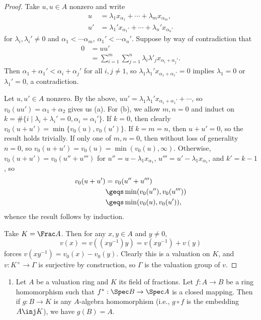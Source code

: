 \documentclass[12pt]{amsart}
\begin{document}
\begin{proof}
  Take $u,u\in A$ nonzero and write
  \begin{align*}
    u &=\lambda_1x_{\alpha_1}+\cdots +\lambda_mx_{\alpha_m}, \\
    u'&=\lambda_1'x_{\alpha_1'}+\cdots +\lambda_n'x_{\alpha_n'}
  \end{align*}
  for $\lambda_i,\lambda_i'\neq 0$ and $\alpha_1<\cdots \alpha_m$, $\alpha_1'<\cdots \alpha_n'$.
  Suppose by way of contradiction that
  \begin{align*}
    0&= uu' \\
     &= \sum_{i=1}^m\sum_{j=1}^n \lambda_i\lambda'_j x_{\alpha_i+\alpha_j'}.
  \end{align*}
  Then $\alpha_1+\alpha_1'<\alpha_i+\alpha_j'$ for all $i,j\neq 1$, so $\lambda_1\lambda_1'x_{\alpha_1+\alpha_1'}=0$ implies $\lambda_1=0$ or $\lambda_1'=0$, a contradiction.

  Let $u,u'\in A$ nonzero. 
  By the above, $uu'=\lambda_1\lambda_1'x_{\alpha_1+\alpha_1'}+\cdots$, so $v_0(uu')=\alpha_1+\alpha_2$ gives us (a).
  For (b), we allow $m,n=0$ and induct on $k=\#\{i\mid \lambda_i+\lambda_i'=0, \alpha_i=\alpha_i'\}$.
  If $k=0$, then clearly $v_0(u+u')=\min\{v_0(u),v_0(u')\}$.
  If $k=m=n$, then $u+u'=0$, so the result holds trivially.
  If only one of $m,n=0$, then without loss of generality $n=0$, so $v_0(u+u')=v_0(u)=\min(v_0(u),\infty)$.
  Otherwise, $v_0(u+u')=v_0(u''+u''')$ for $u''=u-\lambda_1x_{\alpha_1}$, $u'''=u'-\lambda_1x_{\alpha_1}$, and $k'=k-1$, so
  \begin{align*}
    v_0(u+u') &= v_0(u''+u''') \\
            &\geqs \min(v_0(u''),v_0(u''')) \\
            &\geqs \min(v_0(u),v_0(u')),
  \end{align*}
  whence the result follows by induction.

  Take $K=\Frac A$.
  Then for any $x,y\in A$ and $y\neq 0$, 
  \[
    v(x) = v((xy^{-1})y)= v(xy^{-1})+v(y)
  \]
  forces $v(xy^{-1})=v_0(x)-v_0(y)$.
  Clearly this is a valuation on $K$, and $v:K^\times\to \Gamma$ is surjective by construction, so $\Gamma$ is the valuation group of $v$.
\end{proof}

\begin{enumerate}
  \item[5.34] {
      Let $A$ be a valuation ring and $K$ its field of fractions.
      Let $f:A\to B$ be a ring homomorphism such that $f^*:\Spec B\to \Spec A$ is a closed mapping.
      Then if $g:B\to K$ is any $A$-algebra homomorphism (i.e., $g\circ f$ is the embedding $A\inj K$), we have $g(B)=A$.
    }
\end{enumerate}
\end{document}
